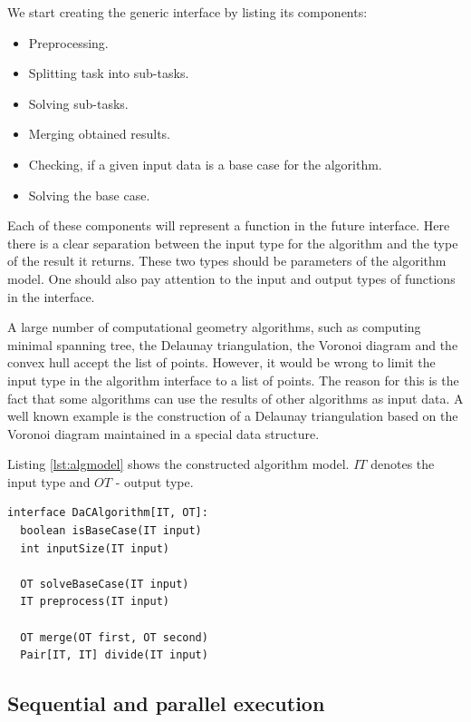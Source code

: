 \documentclass[twoside,twocolumn,10pt]{article}
\begin{document}
	We start creating the generic interface by listing its components:
	
	\begin{itemize}
		\item 
		Preprocessing.
		\item 
		Splitting task into sub-tasks.
		\item 
		Solving sub-tasks.
		\item 
		Merging obtained results.
		\item 
		Checking, if a given input data is a base case for the algorithm.
		\item 
		Solving the base case.
	\end{itemize}
	
	Each of these components will represent a function in the future interface. Here there is a clear separation between the input type for the algorithm and the type of the result it returns. These two types should be parameters of the algorithm model. One should also pay attention to the input and output types of functions  in the interface.
	
	A large number of computational geometry algorithms, such as computing minimal spanning tree, the Delaunay triangulation, the Voronoi diagram and the convex hull accept the list of points. However, it would be wrong to limit the input type in the algorithm interface to a list of points. The reason for this is the fact that some algorithms can use the results of other algorithms as input data. A well known example is the construction of a Delaunay triangulation based on the Voronoi diagram maintained in a special data structure.
	
	Listing \ref{lst:algmodel} shows the constructed algorithm model. $IT$ denotes the input type and $OT$ - output type.
	
		\begin{lstlisting}[caption={Algorithm model based on the ``divide-and-conquer'' principle},label={lst:algmodel},captionpos=b]
interface DaCAlgorithm[IT, OT]:
  boolean isBaseCase(IT input)
  int inputSize(IT input)
  
  OT solveBaseCase(IT input)
  IT preprocess(IT input)
  
  OT merge(OT first, OT second)
  Pair[IT, IT] divide(IT input)

		\end{lstlisting}

\subsection{Sequential and parallel execution}
	
\end{document}
